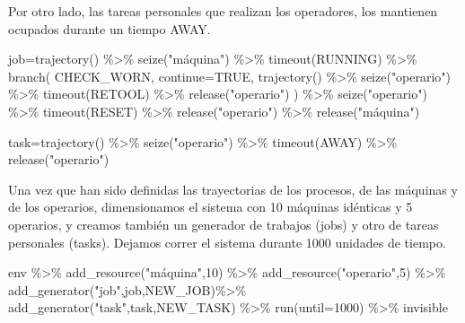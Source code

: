 \documentclass[
]{book}
\newenvironment{Shaded}{\begin{snugshade}}{\end{snugshade}}
\newcommand{\AttributeTok}[1]{\textcolor[rgb]{0.77,0.63,0.00}{#1}}
\newcommand{\ConstantTok}[1]{\textcolor[rgb]{0.00,0.00,0.00}{#1}}
\newcommand{\DecValTok}[1]{\textcolor[rgb]{0.00,0.00,0.81}{#1}}
\newcommand{\FunctionTok}[1]{\textcolor[rgb]{0.00,0.00,0.00}{#1}}
\newcommand{\NormalTok}[1]{#1}
\newcommand{\OtherTok}[1]{\textcolor[rgb]{0.56,0.35,0.01}{#1}}
\newcommand{\SpecialCharTok}[1]{\textcolor[rgb]{0.00,0.00,0.00}{#1}}
\newcommand{\StringTok}[1]{\textcolor[rgb]{0.31,0.60,0.02}{#1}}
\theoremstyle{definition}
\theoremstyle{definition}
\theoremstyle{definition}
\theoremstyle{definition}
\theoremstyle{remark}
\begin{document}
Por otro lado, las tareas personales que realizan los operadores, los mantienen ocupados durante un tiempo AWAY.

\begin{Shaded}
\begin{Highlighting}[]
\NormalTok{job}\OtherTok{=}\FunctionTok{trajectory}\NormalTok{() }\SpecialCharTok{\%\textgreater{}\%}
  \FunctionTok{seize}\NormalTok{(}\StringTok{"máquina"}\NormalTok{) }\SpecialCharTok{\%\textgreater{}\%}
  \FunctionTok{timeout}\NormalTok{(RUNNING) }\SpecialCharTok{\%\textgreater{}\%}
  \FunctionTok{branch}\NormalTok{(}
\NormalTok{    CHECK\_WORN, }\AttributeTok{continue=}\ConstantTok{TRUE}\NormalTok{, }
      \FunctionTok{trajectory}\NormalTok{() }\SpecialCharTok{\%\textgreater{}\%}
        \FunctionTok{seize}\NormalTok{(}\StringTok{"operario"}\NormalTok{) }\SpecialCharTok{\%\textgreater{}\%}
        \FunctionTok{timeout}\NormalTok{(RETOOL) }\SpecialCharTok{\%\textgreater{}\%}
        \FunctionTok{release}\NormalTok{(}\StringTok{"operario"}\NormalTok{)}
\NormalTok{  ) }\SpecialCharTok{\%\textgreater{}\%}
  \FunctionTok{seize}\NormalTok{(}\StringTok{"operario"}\NormalTok{) }\SpecialCharTok{\%\textgreater{}\%}
  \FunctionTok{timeout}\NormalTok{(RESET) }\SpecialCharTok{\%\textgreater{}\%}
  \FunctionTok{release}\NormalTok{(}\StringTok{"operario"}\NormalTok{) }\SpecialCharTok{\%\textgreater{}\%}
  \FunctionTok{release}\NormalTok{(}\StringTok{"máquina"}\NormalTok{)}

\NormalTok{task}\OtherTok{=}\FunctionTok{trajectory}\NormalTok{() }\SpecialCharTok{\%\textgreater{}\%}
  \FunctionTok{seize}\NormalTok{(}\StringTok{"operario"}\NormalTok{) }\SpecialCharTok{\%\textgreater{}\%}
  \FunctionTok{timeout}\NormalTok{(AWAY) }\SpecialCharTok{\%\textgreater{}\%}
  \FunctionTok{release}\NormalTok{(}\StringTok{"operario"}\NormalTok{)}
\end{Highlighting}
\end{Shaded}

Una vez que han sido definidas las trayectorias de los procesos, de las máquinas y de los operarios, dimensionamos el sistema con 10 máquinas idénticas y 5 operarios, y creamos también un generador de trabajos (jobs) y otro de tareas personales (tasks). Dejamos correr el sistema durante 1000 unidades de tiempo.

\begin{Shaded}
\begin{Highlighting}[]
\NormalTok{env }\SpecialCharTok{\%\textgreater{}\%}
  \FunctionTok{add\_resource}\NormalTok{(}\StringTok{"máquina"}\NormalTok{,}\DecValTok{10}\NormalTok{) }\SpecialCharTok{\%\textgreater{}\%}
  \FunctionTok{add\_resource}\NormalTok{(}\StringTok{"operario"}\NormalTok{,}\DecValTok{5}\NormalTok{) }\SpecialCharTok{\%\textgreater{}\%}
  \FunctionTok{add\_generator}\NormalTok{(}\StringTok{"job"}\NormalTok{,job,NEW\_JOB)}\SpecialCharTok{\%\textgreater{}\%}
  \FunctionTok{add\_generator}\NormalTok{(}\StringTok{"task"}\NormalTok{,task,NEW\_TASK) }\SpecialCharTok{\%\textgreater{}\%}
  \FunctionTok{run}\NormalTok{(}\AttributeTok{until=}\DecValTok{1000}\NormalTok{) }\SpecialCharTok{\%\textgreater{}\%}
\NormalTok{  invisible}
\end{Highlighting}
\end{Shaded}
\end{document}
